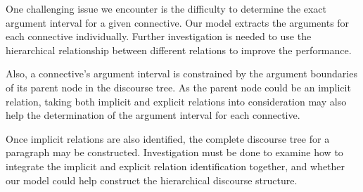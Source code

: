 One challenging issue we encounter is the difficulty to determine
the exact argument interval for a given connective. Our model extracts
the arguments for each connective individually. Further investigation
is needed to use the hierarchical relationship between different
relations to improve the performance.

Also, a connective's argument interval is constrained by the
argument boundaries of its parent node in the discourse tree. As
the parent node could be an implicit relation, taking
both implicit and explicit relations into consideration may also help
the determination of the argument interval for each connective.

Once implicit relations are also identified, 
the complete discourse tree for a paragraph may be constructed.
Investigation must be done to examine how to integrate the implicit and
explicit relation identification together, and whether our model
could help construct the hierarchical discourse structure.
